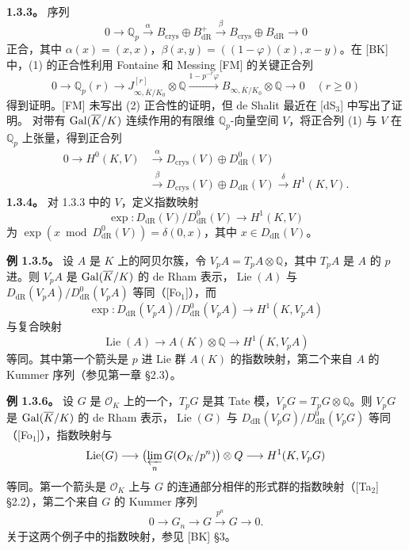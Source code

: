 \textbf{1.3.3。} 序列
\begin{equation*}
 0\longrightarrow\mathbb Q_p\xrightarrow{\alpha}
 B_{\mathrm{crys}}\oplus B^+_{\mathrm{dR}}\xrightarrow{\beta}
 B_{\mathrm{crys}}\oplus B_{\mathrm{dR}}\longrightarrow0\tag{1}
\end{equation*}
正合，其中 $\alpha(x)=(x,x)$，$\beta(x,y)=((1-\varphi)(x),x-y)$。在 [BK] 中，(1) 的正合性利用 Fontaine 和 Messing [FM] 的关键正合列
\begin{equation*}
 0\longrightarrow\mathbb Q_p(r)\longrightarrow J^{[r]}_{\infty,\overline K/K_0}\otimes\mathbb Q
 \xrightarrow{1-p^{-r}\varphi}B_{\infty,\overline K/K_0}\otimes\mathbb Q\longrightarrow0
 \quad(r\ge0)\tag{2}
\end{equation*}
得到证明。[FM] 未写出 (2) 正合性的证明，但 de Shalit 最近在 [dS$_3$] 中写出了证明。
对带有 $\Gal(\overline K/K)$ 连续作用的有限维 $\mathbb Q_p$-向量空间 $V$，将正合列 (1) 与 $V$ 在 $\mathbb Q_p$ 上张量，得到正合列
\begin{equation*}
\begin{aligned}
 0\longrightarrow H^0(K,V)&\xrightarrow{\alpha}D_{\mathrm{crys}}(V)\oplus D^0_{\mathrm{dR}}(V)\\
 &\xrightarrow{\beta}D_{\mathrm{crys}}(V)\oplus D_{\mathrm{dR}}(V)\xrightarrow{\delta}H^1(K,V).
\end{aligned}\tag{3}
\end{equation*}
\textbf{1.3.4。} 对 1.3.3 中的 $V$，定义指数映射
\[
 \exp:D_{\mathrm{dR}}(V)/D^0_{\mathrm{dR}}(V)\longrightarrow H^1(K,V)
\]
为 $\exp(x\bmod D^0_{\mathrm{dR}}(V))=\delta(0,x)$，其中 $x\in D_{\mathrm{dR}}(V)$。

\textbf{例 1.3.5。} 设 $A$ 是 $K$ 上的阿贝尔簇，令 $V_pA=T_pA\otimes\mathbb Q$，其中 $T_pA$ 是 $A$ 的 $p$ 进。则 $V_pA$ 是 $\Gal(\overline K/K)$ 的 de Rham 表示，$\operatorname{Lie}(A)$ 与 $D_{\mathrm{dR}}(V_pA)/D^0_{\mathrm{dR}}(V_pA)$ 等同（[Fo$_1$]），而
\[
 \exp:D_{\mathrm{dR}}(V_pA)/D^0_{\mathrm{dR}}(V_pA)\longrightarrow H^1(K,V_pA)
\]
与复合映射
\[
 \operatorname{Lie}(A)\longrightarrow A(K)\otimes\mathbb Q\longrightarrow H^1(K,V_pA)
\]
等同。其中第一个箭头是 $p$ 进 Lie 群 $A(K)$ 的指数映射，第二个来自 $A$ 的 Kummer 序列（参见第一章 §2.3）。

\textbf{例 1.3.6。} 设 $G$ 是 $\mathcal O_K$ 上的一个，$T_pG$ 是其 Tate 模，$V_pG=T_pG\otimes\mathbb Q$。则 $V_pG$ 是 $\Gal(\overline K/K)$ 的 de Rham 表示，$\operatorname{Lie}(G)$ 与 $D_{\mathrm{dR}}(V_pG)/D^0_{\mathrm{dR}}(V_pG)$ 等同（[Fo$_1$]），指数映射与
\[
 \operatorname{Lie}(G)\longrightarrow\bigl(\varprojlim_n G(\mathcal O_K/p^n)\bigr)\otimes\mathbb Q
 \longrightarrow H^1(K,V_pG)
\]
等同。第一个箭头是 $\mathcal O_K$ 上与 $G$ 的连通部分相伴的形式群的指数映射（[Ta$_2$] §2.2），第二个来自 $G$ 的 Kummer 序列
\[
 0\longrightarrow G_n\longrightarrow G\xrightarrow{p^n}G\longrightarrow0.
\]
关于这两个例子中的指数映射，参见 [BK] §3。

